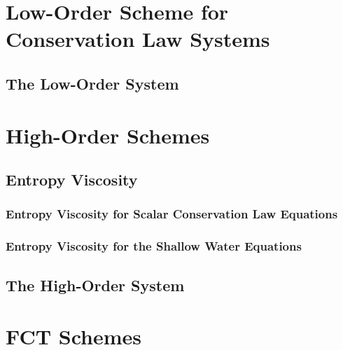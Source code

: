 \section{Low-Order Scheme for Conservation Law Systems}  
%  
\subsection{The Low-Order System\label{sec:low_order_system_domain_invariant}}
  
\section{High-Order Schemes}  
\subsection{Entropy Viscosity\label{sec:entropy_viscosity}}
  \subsubsection{Entropy Viscosity for Scalar Conservation Law Equations
    \label{sec:entropy_viscosity_scalar}}
    
  \subsubsection{Entropy Viscosity for the Shallow Water Equations
    \label{sec:shallowwater_entropy_viscosity}}
    
\subsection{The High-Order System}
  
\section{FCT Schemes}  
